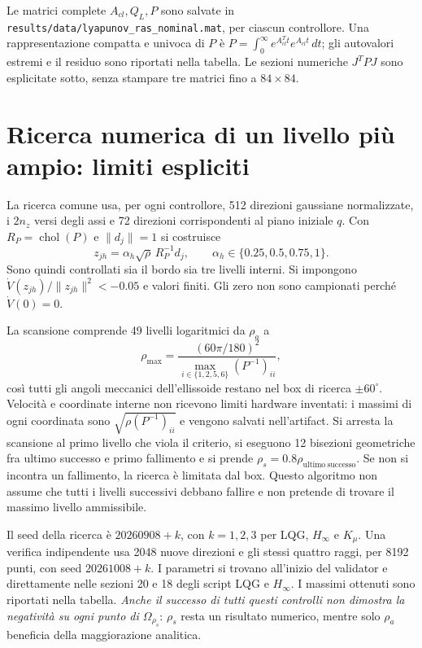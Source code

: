 
Le matrici complete $A_{cl},Q_L,P$ sono salvate in
\texttt{results/data/lyapunov\_ras\_nominal.mat}, per ciascun controllore.
Una rappresentazione compatta e univoca di $P$ è
$P=\int_0^\infty e^{A_{cl}^Tt}e^{A_{cl}t}\,dt$; gli autovalori estremi e il
residuo sono riportati nella tabella. Le sezioni numeriche $J^TPJ$ sono
esplicitate sotto, senza stampare tre matrici fino a $84\times84$.

\section{Ricerca numerica di un livello più ampio: limiti espliciti}
La ricerca comune usa, per ogni controllore, 512 direzioni gaussiane normalizzate,
i $2n_z$ versi degli assi e 72 direzioni corrispondenti al piano iniziale $q$.
Con $R_P=\operatorname{chol}(P)$ e $\|d_j\|=1$ si costruisce
\[
z_{jh}=\alpha_h\sqrt{\rho}\,R_P^{-1}d_j,\qquad
\alpha_h\in\{0.25,0.5,0.75,1\}.
\]
Sono quindi controllati sia il bordo sia tre livelli interni.
Si impongono $\dot V(z_{jh})/\|z_{jh}\|^2<-0.05$ e valori finiti.
Gli zero non sono campionati perché $\dot V(0)=0$.

La scansione comprende 49 livelli logaritmici da $\rho_a$ a
\[
\rho_{\max}=\frac{(60\pi/180)^2}
{\max_{i\in\{1,2,5,6\}}(P^{-1})_{ii}},
\]
così tutti gli angoli meccanici dell'ellissoide restano nel box di ricerca
$\pm60^\circ$. Velocità e coordinate interne non ricevono limiti hardware
inventati: i massimi di ogni coordinata sono
$\sqrt{\rho(P^{-1})_{ii}}$ e vengono salvati nell'artifact.
Si arresta la scansione al primo livello che viola il criterio, si eseguono
12 bisezioni geometriche fra ultimo successo e primo fallimento e si prende
$\rho_s=0.8\rho_{\mathrm{ultimo\ successo}}$.
Se non si incontra un fallimento, la ricerca è limitata dal box.
Questo algoritmo non assume che tutti i livelli successivi debbano fallire
e non pretende di trovare il massimo livello ammissibile.

Il seed della ricerca è $20260908+k$, con $k=1,2,3$ per LQG, $H_\infty$ e $K_\mu$.
Una verifica indipendente usa 2048 nuove direzioni e gli stessi quattro raggi,
per 8192 punti, con seed $20261008+k$.
I parametri si trovano all'inizio del validator e direttamente nelle sezioni
20 e 18 degli script LQG e $H_\infty$. I massimi ottenuti sono riportati nella tabella.
\emph{Anche il successo di tutti questi controlli non dimostra la negatività
su ogni punto di $\Omega_{\rho_s}$}: $\rho_s$ resta un risultato numerico,
mentre solo $\rho_a$ beneficia della maggiorazione analitica.

